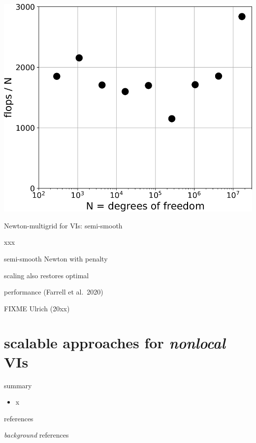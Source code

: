 \documentclass[svgnames,
               hyperref={colorlinks,citecolor=DeepPink4,linkcolor=FireBrick,urlcolor=Maroon},
               usepdftitle=false]  %
               {beamer}
\makeatletter
\newcommand\notsotiny{\@setfontsize\notsotiny\@viipt\@viiipt}
\makeatother
\begin{document}
\begin{frame}[fragile]
\vspace{-22mm}
\hfill \includegraphics[height=0.45\textheight]{images/obstacle-flops-per-n.png}
\end{frame}



\begin{frame}{Newton-multigrid for VIs: semi-smooth}

xxx

semi-smooth Newton with penalty

scaling also restores optimal

performance (Farrell et al.~2020)

FIXME Ulrich (20xx)

\end{frame}


\section{scalable approaches for \emph{nonlocal} VIs}


\begin{frame}{\alert{summary}}

\begin{itemize}
\item x
\end{itemize}
\end{frame}


\begin{frame}{references}

{\scriptsize

}
\end{frame}

\begin{frame}{\emph{background} references}

{\scriptsize

}
\end{frame}
\end{document}
